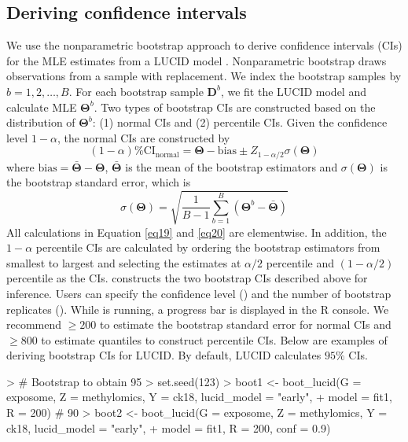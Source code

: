 \subsection{Deriving confidence intervals} \label{sec3.4}
We use the nonparametric bootstrap approach to derive confidence intervals (CIs) for the MLE estimates from a LUCID model \citep{davison1997bootstrap}. Nonparametric bootstrap draws observations from a sample with replacement. We index the bootstrap samples by $b = 1, 2, \ldots, B$. For each bootstrap sample $\bm{D}^b$, we fit the LUCID model and calculate MLE $\bm{\Theta}^b$. Two types of bootstrap CIs are constructed based on the distribution of $\bm{\Theta}^b$: (1) normal CIs and (2) percentile CIs.
Given the confidence level $1 - \alpha$, the normal CIs are constructed by 
\begin{equation}
    (1 - \alpha)\% \text{CI}_{\text{normal}} = \bm{\Theta} - \text{bias} \pm Z_{1 - \alpha/2}\sigma(\bm \Theta)
    \label{eq19}
\end{equation}
where $\text{bias} = \bar{\bm \Theta} - \bm{\Theta}$, $\bar{\bm \Theta}$ is the mean of the bootstrap estimators and $\sigma(\bm \Theta)$ is the bootstrap standard error, which is
\begin{equation}
    \sigma(\bm \Theta) = \sqrt{\frac{1}{B - 1}\sum_{b=1}^B\left(\bm{\Theta}^b - \bar{\bm \Theta}\right)}
    \label{eq20}
\end{equation}
All calculations in Equation \ref{eq19} and \ref{eq20} are elementwise.
In addition, the $1 - \alpha$ percentile CIs are calculated by ordering the bootstrap estimators from smallest to largest and selecting the estimates at $\alpha/2$ percentile and $(1 - \alpha/2)$ percentile as the CIs.
 constructs the two bootstrap CIs described above for inference. Users can specify the confidence level () and the number of bootstrap replicates (). While  is running, a progress bar is displayed in the R console. We recommend  $\geq 200$ to estimate the bootstrap standard error for normal CIs and  $\geq 800$ to estimate quantiles to construct percentile CIs. Below are examples of deriving bootstrap CIs for LUCID. By default, LUCID calculates $95\%$ CIs.
\begin{example}
> # Bootstrap to obtain 95%
> set.seed(123)
> boot1 <- boot_lucid(G = exposome, Z = methylomics, Y = ck18, lucid_model = "early", 
+                     model = fit1, R = 200)
# 90%
> boot2 <- boot_lucid(G = exposome, Z = methylomics, Y = ck18, lucid_model = "early", 
+                     model = fit1, R = 200, conf = 0.9)
\end{example}
